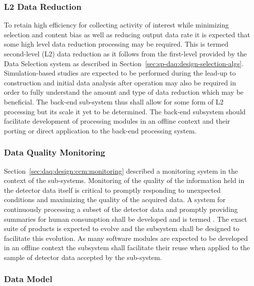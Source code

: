 \subsubsection{L2 Data Reduction}
\label{sec:fd-daq:design-data-reduction}

To retain high efficiency for collecting activity of interest while minimizing selection and content bias as well as reducing output data rate it is expected that some high level data reduction processing may be required. 
This is termed second-level (L2) data reduction as it follows from the first-level provided by the Data Selection system as described in Section~\ref{sec:sp-daq:design-selection-algs}.
Simulation-based studies are expected to be performed during the lead-up to construction and initial data analysis after operation may also be required in order to fully understand the amount and type of data reduction which may be beneficial. 
The  back-end sub-system thus shall allow for some form of L2 processing but its scale it yet to be determined. 
The back-end subsystem should facilitate development of processing modules in an offline context and their porting or direct application to the back-end processing system.



\subsubsection{Data Quality Monitoring}
\label{sec:fd-daq:design-data-quality}

Section~\ref{sec:daq:design:ccm:monitoring} described a monitoring system in the context of the  sub-systems. 
Monitoring of the quality of the information held in the detector data itself is critical to promptly responding to unexpected conditions and maximizing the quality of the acquired data. 
A system for continuously processing a subset of the detector data and promptly providing summaries for human consumption shall be developed and is termed  .
The exact suite of products is expected to evolve and the  subsystem shall be designed to facilitate this evolution. 
As many software modules are expected to be developed in an offline context the  subsystem shall facilitate their reuse when applied to the sample of detector data accepted by the sub-system.


\subsubsection{Data Model}
\label{sec:fd-daq:design-data-model}

